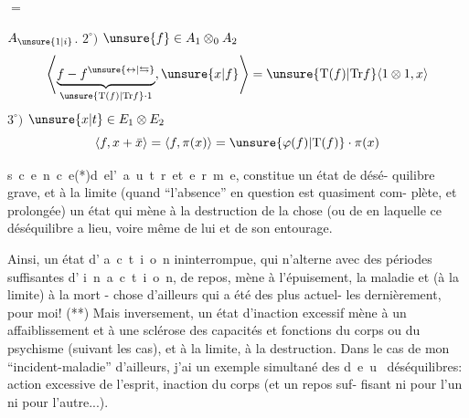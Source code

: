 $=$ 

 $A_{\unsure{1|i}}$.
$2^\circ)$ $\unsure{f}\in A_1\otimes_0 A_2$ 
\[
\left\langle\underbrace{f-f^{\unsure{\leftrightarrow|\leftrightarrows}}}_{\unsure{\mathrm T(f)|\mathrm{Tr}f}\cdot1},\unsure{x|f}\right\rangle
=\unsure{\mathrm T(f)|\mathrm{Tr}f}\langle1\otimes1,x\rangle
\]
$3^\circ)$ $\unsure{x|t}\in E_1\otimes E_2$
\[
\langle f,x+\bar x\rangle=\langle f,\pi(x)\rangle=\unsure{\varphi(f)|\mathrm T(f)}\cdot\pi(x)
\]

\mbox{s c e n c e}\quad (*)\quad \mbox{d e\quad l' a u t r e\quad t e r m e}, constitue un état de désé-
quilibre grave, et à la limite (quand ``l'absence'' en question est quasiment com-
plète, et prolongée) un état qui mène à la destruction de la chose (ou de 
en laquelle ce déséquilibre a lieu, voire même de lui et de son entourage.

Ainsi, un état d' \mbox{a c t i o n} ininterrompue, qui n'alterne avec des
périodes suffisantes d' \mbox{i n a c t i o n}, de repos, mène à l'épuisement, la
maladie et (à la limite) à la mort - chose d'ailleurs qui a été des plus actuel-
les dernièrement, pour moi! (**) Mais inversement, un état d'inaction excessif
mène à un affaiblissement et à une sclérose des capacités et fonctions du corps
ou du psychisme (suivant les cas), et à la limite, à la destruction. Dans le
cas de mon ``incident-maladie'' d'ailleurs, j'ai un exemple simultané des \mbox{d e u }
déséquilibres: action excessive de l'esprit, inaction du corps (et un repos suf-
fisant ni pour l'un ni pour l'autre...).

